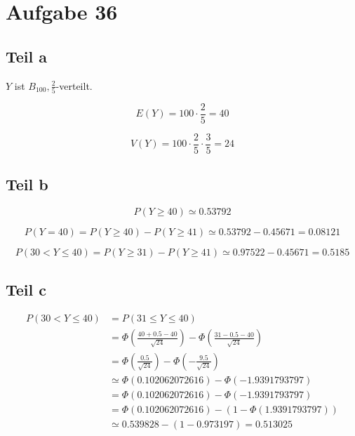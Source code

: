 \documentclass[10pt,a4paper]{article}
\begin{document}
\section{Aufgabe 36}

\subsection{Teil a}

$Y$ ist $B_{100}, \frac{2}{5}$-verteilt.

\begin{equation}
  E(Y) = 100 \cdot \frac{2}{5} = 40
\end{equation}

\begin{equation}
  V(Y) = 100 \cdot \frac{2}{5} \cdot \frac{3}{5} = 24
\end{equation}

\subsection{Teil b}

\begin{equation}
  P(Y \ge 40) \simeq 0.53792
\end{equation}

\begin{equation}
  P(Y = 40) = P(Y \ge 40) - P(Y \ge 41) \simeq 0.53792 - 0.45671 = 0.08121
\end{equation}

\begin{equation}
  P(30 < Y \le 40) = P(Y \ge 31) - P(Y \ge 41) \simeq 0.97522 - 0.45671 = 0.5185
\end{equation}

\subsection{Teil c}

\begin{align*}
  P(30 < Y \le 40) & = P(31 \le Y \le 40)\\
  & = \Phi\left( \frac{40 + 0.5 - 40}{\sqrt{24}} \right) - \Phi\left( \frac{31 - 0.5 - 40}{\sqrt{24}} \right)\\
  & = \Phi\left( \frac{0.5}{\sqrt{24}} \right) - \Phi\left( -\frac{9.5}{\sqrt{24}} \right)\\
  & \simeq \Phi(0.102062072616) - \Phi(-1.9391793797)\\
  & = \Phi(0.102062072616) - \Phi(-1.9391793797)\\
  & = \Phi(0.102062072616) - (1 - \Phi(1.9391793797))\\
  & \simeq 0.539828 - (1 - 0.973197) = 0.513025
\end{align*}
\end{document}
